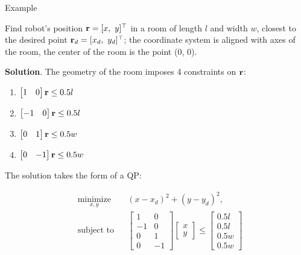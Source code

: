 \documentclass{beamer}
\begin{document}
\begin{frame}{Example}
	\begin{flushleft}
		
		Find robot's position $\bo{r} = [x, \ y]\T$ in a room of length $l$ and width $w$, closest to the desired point $\mathbf{r}_d= [x_d, \ y_d]^\top$; the coordinate system is aligned with axes of the room, the center of the room is the point (0, 0).
		
		\bigskip
		
		\hspace{-0.2in}
		\textbf{Solution}. The geometry of the room imposes 4 constraints on $\mathbf{r}$:
		
		\begin{multicols}{2}
		\begin{enumerate}
			\item $\begin{bmatrix} 1 & 0 \end{bmatrix} \mathbf{r} \leq 0.5 l$
			\item $\begin{bmatrix} -1 & 0 \end{bmatrix}  \mathbf{r} \leq 0.5 l$
			\item $\begin{bmatrix} 0 & 1 \end{bmatrix}  \mathbf{r} \leq 0.5 w$
			\item $\begin{bmatrix} 0 & -1 \end{bmatrix}  \mathbf{r} \leq 0.5 w$
		\end{enumerate}
	\end{multicols}
		
		The solution takes the form of a QP:
		
		\begin{equation}
			\begin{aligned}
				& \underset{x, y}{\text{minimize}}
				& & (x-x_d)^2 + (y-y_d)^2, \\
				& \text{subject to}
				& & \begin{bmatrix} 1 & 0 \\ -1 & 0 \\ 0 & 1 \\ 0 & -1 \end{bmatrix}
				\begin{bmatrix} x \\ y \end{bmatrix}
				\leq
				\begin{bmatrix} 0.5 l \\ 0.5 l \\ 0.5 w \\ 0.5 w \end{bmatrix}
			\end{aligned}
		\end{equation}
		
	\end{flushleft}
\end{frame}
\end{document}
